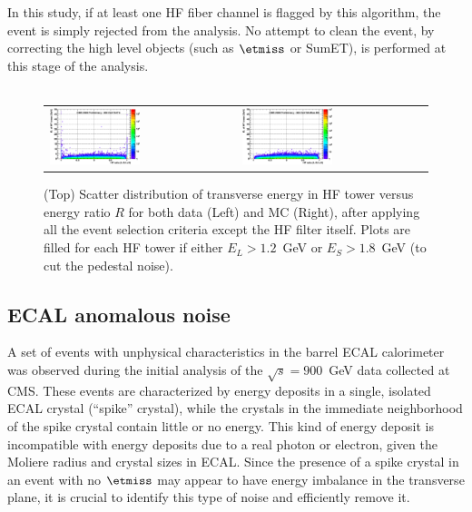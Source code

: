 \begin{itemize}
In this study, if at least one HF fiber channel is flagged by this algorithm, 
the event is simply rejected from the analysis. No attempt to clean the event, 
by correcting the high level objects (such as $\etmiss$ or SumET), 
is performed at this stage of the analysis. 
\\
\\
%
%
\begin{figure}[h!]
 \centering
 \begin{tabular}{ll}
  \includegraphics[width=0.5\textwidth]{plots_hcalnoise/hf_towerET_vs_ratio_DATA.eps} &
  \includegraphics[width=0.5\textwidth]{plots_hcalnoise/hf_towerET_vs_ratio_MC.eps} \\
 \end{tabular}
\caption{\small (Top) Scatter distribution of transverse energy in HF tower versus energy ratio $R$ for both data 
(Left) and MC (Right), after applying all the event selection criteria except the HF filter itself. 
Plots are filled for each HF tower if either $E_L>1.2$~GeV or $E_S>1.8$~GeV (to cut the pedestal noise).
\label{fig:hf_noise_ET_vs_R}}
\end{figure}
%
%
\end{itemize}

\subsection{ECAL anomalous noise}

A set of events with unphysical characteristics in the barrel ECAL
calorimeter was observed during the initial analysis of the
$\sqrt{s}=900$~GeV data collected at CMS. These events are characterized
by energy deposits in a single, isolated ECAL crystal (``spike''
crystal), while the crystals in the immediate neighborhood of the spike
crystal contain little or no energy. This kind of energy deposit is
incompatible with energy deposits due to a real photon or electron,
given the Moliere radius and crystal sizes in ECAL. Since the presence
of a spike crystal in an event with no $\etmiss$ may appear to have
energy imbalance in the transverse plane, it is crucial to identify this
type of noise and efficiently remove it.

